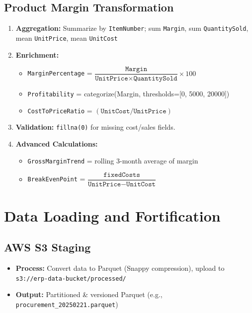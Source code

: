 \documentclass[a4paper,10pt]{article}
\begin{document}
\section{Product Margin Transformation}
\begin{enumerate}[leftmargin=2em]
    \item \textbf{Aggregation:} Summarize by \texttt{ItemNumber}; sum \texttt{Margin}, sum \texttt{QuantitySold}, mean \texttt{UnitPrice}, mean \texttt{UnitCost}
    \item \textbf{Enrichment:}
    \begin{itemize}[leftmargin=1.5em]
        \item \texttt{MarginPercentage} = $\dfrac{\texttt{Margin}}{\texttt{UnitPrice} \times \texttt{QuantitySold}} \times 100$
        \item \texttt{Profitability} = categorize(Margin, thresholds=[0, 5000, 20000])
        \item \texttt{CostToPriceRatio} = $(\texttt{UnitCost} / \texttt{UnitPrice})$
    \end{itemize}
    \item \textbf{Validation:} \texttt{fillna(0)} for missing cost/sales fields.
    \item \textbf{Advanced Calculations:}
    \begin{itemize}[leftmargin=1.5em]
        \item \texttt{GrossMarginTrend} = rolling 3-month average of margin
        \item \texttt{BreakEvenPoint} = $\dfrac{\texttt{fixedCosts}}{\texttt{UnitPrice} - \texttt{UnitCost}}$
    \end{itemize}
\end{enumerate}

\chapter{Data Loading and Fortification}

\section{AWS S3 Staging}
\begin{itemize}[leftmargin=2em]
    \item \textbf{Process:} Convert data to Parquet (Snappy compression), upload to \texttt{s3://erp-data-bucket/processed/}
    \item \textbf{Output:} Partitioned \& versioned Parquet (e.g., \texttt{procurement\_20250221.parquet})
\end{itemize}
\end{document}
